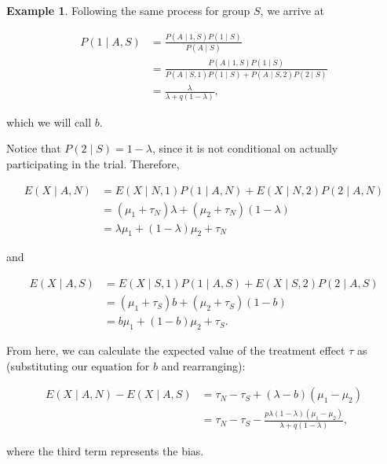 \documentclass[
  openany]{book}
\theoremstyle{definition}
\theoremstyle{definition}
\newtheorem{example}{Example}[chapter]
\theoremstyle{definition}
\theoremstyle{definition}
\theoremstyle{remark}
\begin{document}
\begin{example}
Following the same process for group \(S\), we arrive at

\begin{align*}
P\left(1\mid{A,S}\right) & =  \frac{P\left(A\mid{1,S}\right)P\left(1\mid{S}\right)}{P\left(A\mid{S}\right)}\\
& = \frac{P\left(A\mid{1,S}\right)P\left(1\mid{S}\right)}{P\left(A\mid{S,1}\right)P\left(1\mid{S}\right) + P\left(A\mid{S,2}\right)P\left(2\mid{S}\right)} \\
& = \frac{\lambda}{\lambda + q\left(1-\lambda\right)},
\end{align*}

which we will call \(b\).

Notice that \(P\left(2\mid{S}\right)= 1-\lambda\), since it is not conditional on actually participating in the trial. Therefore,

\begin{align*}
E\left(X\mid{A,N}\right) & = E \left(X\mid{N,1}\right)P\left(1\mid{A,N}\right) + E \left(X\mid{N,2}\right)P\left(2\mid{A,N}\right) \\
& = \left(\mu_1 + \tau_N\right)\lambda + \left(\mu_2 + \tau_N\right)\left(1-\lambda\right) \\
& = \lambda\mu_1 + \left(1-\lambda\right)\mu_2 + \tau_N
\end{align*}

and

\begin{align*}
E\left(X\mid{A,S}\right) & = E \left(X\mid{S,1}\right)P\left(1\mid{A,S}\right) + E \left(X\mid{S,2}\right)P\left(2\mid{A,S}\right) \\
& = \left(\mu_1 + \tau_S\right)b + \left(\mu_2 + \tau_S\right)\left(1-b\right) \\
& = b\mu_1 + \left(1-b\right)\mu_2 + \tau_S.
\end{align*}

From here, we can calculate the expected value of the treatment effect \(\tau\) as (substituting our equation for \(b\) and rearranging):

\begin{align*}
E\left(X\mid{A,N}\right) - E\left(X\mid{A,S}\right) & = \tau_N - \tau_S + \left(\lambda - b\right)\left(\mu_1 - \mu_2\right) \\
& = \tau_N - \tau_S - \frac{p\lambda\left(1-\lambda\right)\left(\mu_1  - \mu_2\right)}{\lambda + q\left(1-\lambda\right)},
\end{align*}

where the third term represents the bias.


\end{example}
\end{document}
